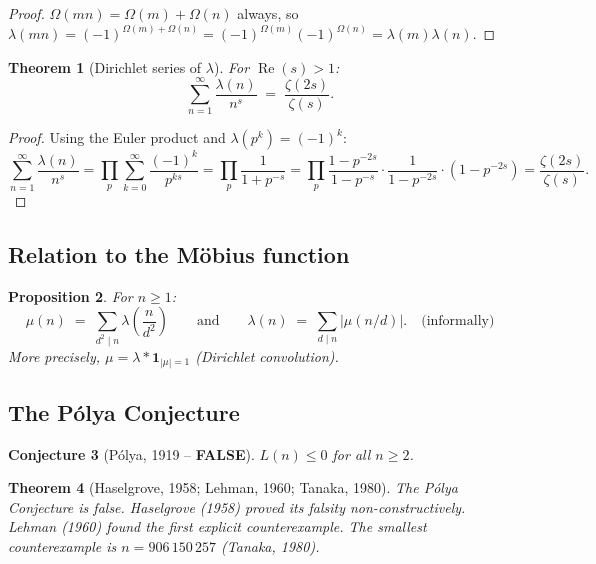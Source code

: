 \documentclass[12pt,a4paper]{amsart}
\newtheorem{theorem}{Theorem}[section]
\newtheorem{proposition}[theorem]{Proposition}
\newtheorem{conjecture}[theorem]{Conjecture}
\theoremstyle{definition}
\begin{document}
\begin{proof}
$\Omega(mn) = \Omega(m) + \Omega(n)$ always, so $\lambda(mn) = (-1)^{\Omega(m)+\Omega(n)}
= (-1)^{\Omega(m)}(-1)^{\Omega(n)} = \lambda(m)\lambda(n)$.
\end{proof}

\begin{theorem}[Dirichlet series of $\lambda$]
\label{thm:liouville-dirichlet}
For $\operatorname{Re}(s) > 1$:
\[
  \sum_{n=1}^{\infty} \frac{\lambda(n)}{n^s}
  \;=\; \frac{\zeta(2s)}{\zeta(s)}.
\]
\end{theorem}

\begin{proof}
Using the Euler product and $\lambda(p^k) = (-1)^k$:
\[
  \sum_{n=1}^{\infty}\frac{\lambda(n)}{n^s}
  = \prod_p \sum_{k=0}^{\infty}\frac{(-1)^k}{p^{ks}}
  = \prod_p \frac{1}{1+p^{-s}}
  = \prod_p \frac{1-p^{-2s}}{1-p^{-s}} \cdot \frac{1}{1-p^{-2s}}\cdot(1-p^{-2s})
  = \frac{\zeta(2s)}{\zeta(s)}.
\]
\end{proof}

\subsection{Relation to the Möbius function}

\begin{proposition}
\label{prop:lambda-mu}
For $n \ge 1$:
\[
  \mu(n) \;=\; \sum_{d^2 \mid n} \lambda\!\left(\frac{n}{d^2}\right)
  \qquad\text{and}\qquad
  \lambda(n) \;=\; \sum_{d \mid n} |\mu(n/d)|. \quad\text{(informally)}
\]
More precisely, $\mu = \lambda * \mathbf{1}_{|\mu|=1}$ (Dirichlet convolution).
\end{proposition}

\subsection{The Pólya Conjecture}

\begin{conjecture}[Pólya, 1919 -- \textbf{FALSE}]
\label{conj:polya}
$L(n) \le 0$ for all $n \ge 2$.
\end{conjecture}

\begin{theorem}[Haselgrove, 1958; Lehman, 1960; Tanaka, 1980]
\label{thm:haselgrove}
The Pólya Conjecture is \emph{false}.  Haselgrove (1958) proved its
falsity non-constructively.  Lehman (1960) found the first explicit
counterexample.  The smallest counterexample is $n = 906\,150\,257$
(Tanaka, 1980).
\end{theorem}
\end{document}
